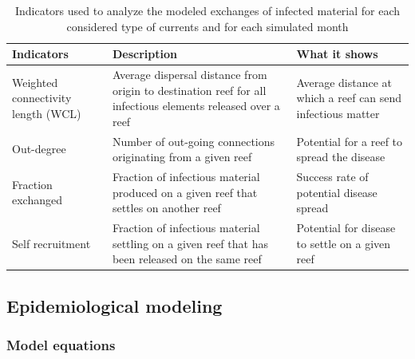 \documentclass[utf8]{frontiersSCNS}
\begin{document}
\begin{table}
    \centering
    \begin{tabular}{|p{4cm}|p{5cm}|p{4cm}|}
        \hline
        \textbf{Indicators} & \textbf{Description} & \textbf{What it shows} \\
        \hline
            Weighted connectivity length (WCL) & 
            Average dispersal distance from origin to destination reef for all infectious elements released over a reef & 
            Average distance at which a reef can send infectious matter \\
        \hline
            Out-degree &
            Number of out-going connections originating from a given reef &
            Potential for a reef to spread the disease \\
        \hline
            Fraction exchanged &
            Fraction of infectious material produced on a given reef that settles on another reef &
            Success rate of potential disease spread  \\
        \hline
            Self recruitment &
            Fraction of infectious material settling on a given reef that has been released on the same reef &
            Potential for disease to settle on a given reef \\
        \hline            
    \end{tabular}
    \caption{Indicators used to analyze the modeled exchanges of infected material for each considered type of currents and for each simulated month}
    \label{tab:indicator}
\end{table}

\subsection{Epidemiological modeling}

\subsubsection{Model equations}
\end{document}

